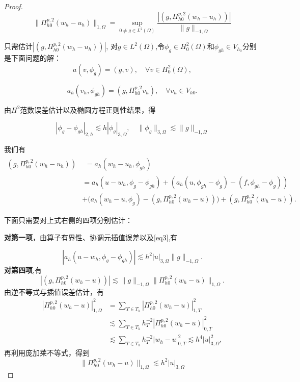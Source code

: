 \documentclass[12pt,a4paper]{article}
\begin{document}
\begin{enumerate}
\begin{proof}
			\begin{equation}\label{eq2}
				\|\Pi_{h0}^{p,2}(w_h-u_h)\|_{1,\Omega}=\sup_{0\neq g\in L^2(\Omega)}\frac{|(g,\Pi_{h0}^{p,2}(w_h-u_h))|}{\|g\|_{-1,\Omega}}
			\end{equation}
			
			
			只需估计$|(g,\Pi_{h0}^{p,2}(w_h-u_h))|$, 对$g\in L^2(\Omega)$,令$\phi_g\in H_0^2(\Omega)$和$\phi_{gh}\in V_{h_0}$分别是下面问题的解：
			$$a(v,\phi_g)=(g,v),\quad\forall v\in H_0^2(\Omega),$$
			
			$$a_h(v_h,\phi_{gh})=(g,\Pi_{h0}^{p,2}v_h),\quad\forall v_h\in V_{h0}.$$
			
			
			由$H^2$范数误差估计以及椭圆方程正则性结果，得
			
			\begin{equation}\label{eq3}
				|\phi_g-\phi_{gh}|_{2,h}\lesssim h|\phi_g|_{3,\Omega},\quad\|\phi_g\|_{3,\Omega}\lesssim\|g\|_{-1,\Omega}
			\end{equation}
			
			
			我们有
			$$
			\begin{aligned}
				(g,\Pi_{h0}^{p,2}(w_h-u_h))& \begin{aligned}=a_h(w_h-u_h,\phi_{gh})\end{aligned}  \\
				&=a_h(u-w_h,\phi_g-\phi_{gh})+\left(a_h(u,\phi_{gh}-\phi_g)-(f,\phi_{gh}-\phi_g)\right) \\
				&+\Big(a_h(w_h-u,\phi_g)-(g,\Pi_{h0}^{p,2}(w_h-u))\Big)+(g,\Pi_{h0}^{p,2}(w_h-u)).
			\end{aligned}
			$$
			
			下面只需要对上式右侧的四项分别估计：
			
			\textbf{对第一项}，由算子有界性、协调元插值误差以及\eqref{eq3},有
			
			\begin{equation}\label{eq4}
				|a_h(u-w_h,\phi_g-\phi_{gh})|\lesssim h^2|u|_{3,\Omega}\|g\|_{-1,\Omega}.
			\end{equation}
			\textbf{对第四项},有
			$$|(g,\Pi_{h0}^{p,2}(w_h-u))|\lesssim\|g\|_{-1,\Omega}\|\Pi_{h0}^{p,2}(w_h-u)\|_{1,\Omega}.$$
			由逆不等式与插值误差估计，有
			$$\begin{aligned}|\Pi_{h0}^{p,2}(w_{h}-u)|_{1,\Omega}^{2}&=\sum_{T\in T_{h}}|\Pi_{h0}^{p,2}(w_{h}-u)|_{1,T}^{2}\\&\lesssim\sum_{T\in T_{h}}h_{T}^{-2}|\Pi_{h0}^{p,2}(w_{h}-u)|_{0,T}^{2}\\&\lesssim\sum_{T\in T_{h}}h_{T}^{-2}|w_{h}-u|_{0,T}^{2}\lesssim h^{4}|u|_{3,\Omega}^{2},\end{aligned}$$
			再利用庞加莱不等式，得到
			\begin{equation}\label{eq5}
				\|\Pi_{h0}^{p,2}(w_h-u)\|_{1,\Omega}\lesssim h^2|u|_{3,\Omega}
			\end{equation}
			

\end{proof}
\end{enumerate}
\end{document}
